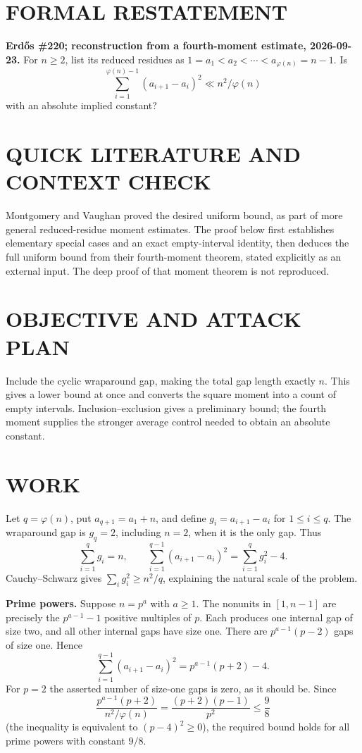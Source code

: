 \section{FORMAL RESTATEMENT}
\textbf{Erd\H{o}s \#220; reconstruction from a fourth-moment estimate, 2026-09-23.}
For $n\geq2$, list its reduced residues as $1=a_1<a_2<\cdots<a_{\varphi(n)}=n-1$. Is
\[
\sum_{i=1}^{\varphi(n)-1}(a_{i+1}-a_i)^2\ll n^2/\varphi(n)
\]
with an absolute implied constant?

\section{QUICK LITERATURE AND CONTEXT CHECK}
Montgomery and Vaughan proved the desired uniform bound, as part of more general reduced-residue moment estimates. The proof below first establishes elementary special cases and an exact empty-interval identity, then deduces the full uniform bound from their fourth-moment theorem, stated explicitly as an external input. The deep proof of that moment theorem is not reproduced.

\section{OBJECTIVE AND ATTACK PLAN}
Include the cyclic wraparound gap, making the total gap length exactly $n$. This gives a lower bound at once and converts the square moment into a count of empty intervals. Inclusion--exclusion gives a preliminary bound; the fourth moment supplies the stronger average control needed to obtain an absolute constant.

\section{WORK}
Let $q=\varphi(n)$, put $a_{q+1}=a_1+n$, and define $g_i=a_{i+1}-a_i$ for $1\leq i\leq q$. The wraparound gap is $g_q=2$, including $n=2$, when it is the only gap. Thus
\[
\sum_{i=1}^qg_i=n,\qquad
\sum_{i=1}^{q-1}(a_{i+1}-a_i)^2=\sum_{i=1}^qg_i^2-4.
\tag{1}
\]
Cauchy--Schwarz gives $\sum_i g_i^2\geq n^2/q$, explaining the natural scale of the problem.

\textbf{Prime powers.} Suppose $n=p^a$ with $a\geq1$. The nonunits in $[1,n-1]$ are precisely the $p^{a-1}-1$ positive multiples of $p$. Each produces one internal gap of size two, and all other internal gaps have size one. There are $p^{a-1}(p-2)$ gaps of size one. Hence
\[
\sum_{i=1}^{q-1}(a_{i+1}-a_i)^2
=p^{a-1}(p+2)-4.
\tag{2}
\]
For $p=2$ the asserted number of size-one gaps is zero, as it should be. Since
\[
\frac{p^{a-1}(p+2)}{n^2/\varphi(n)}
=\frac{(p+2)(p-1)}{p^2}\leq\frac98
\]
(the inequality is equivalent to $(p-4)^2\geq0$), the required bound holds for all prime powers with constant $9/8$.

